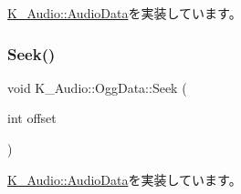 \mbox{\hyperlink{class_k___audio_1_1_audio_data_af42b123ad2ce45867401d697fd572392}{K\+\_\+\+Audio\+::\+Audio\+Data}}を実装しています。

\mbox{\label{class_k___audio_1_1_ogg_data_aac0e955981398bf31053f27fbe19b2ba}} 
\subsubsection{\texorpdfstring{Seek()}{Seek()}}
{\footnotesize\ttfamily void K\+\_\+\+Audio\+::\+Ogg\+Data\+::\+Seek (\begin{DoxyParamCaption}\item[{int}]{offset }\end{DoxyParamCaption})\hspace{0.3cm}{\ttfamily [virtual]}}



\mbox{\hyperlink{class_k___audio_1_1_audio_data_a1ba3ab1b4bae0b460d26278cb29ce16e}{K\+\_\+\+Audio\+::\+Audio\+Data}}を実装しています。


